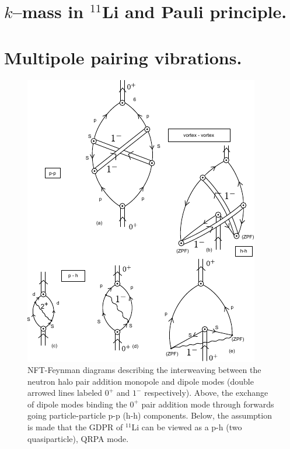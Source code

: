 \begin{subappendices}
\section{$k$--mass in $^{11}$Li and Pauli principle.}\label{App6I}


\section{Multipole pairing vibrations.}\label{App6G}
\begin{figure}
\includegraphics[width=\textwidth]{C8/figsC8/figA1_corr.pdf}
\caption{ NFT-Feynman diagrams describing the interweaving between the neutron halo pair addition monopole and dipole modes
(double arrowed lines labeled $0^+$ and $1^-$ respectively). Above, the exchange of dipole modes binding the $0^+$ pair addition mode through  forwards going particle-particle p-p (h-h) components. Below,  the assumption is made that the GDPR of $^{11}$Li can be viewed as a p-h (two quasiparticle), QRPA mode.}\label{fig6.I.1}
\end{figure}


\end{subappendices}
